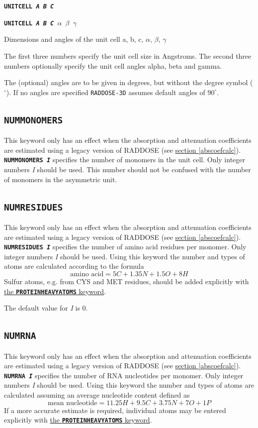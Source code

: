\documentclass[a4paper]{article}
\newcommand{\RD}{\texttt{RADDOSE-3D}\xspace}
\newcommand{\Keyword}[1]{\texttt{\textbf{#1}}\xspace}
\newcommand{\SB}{\\[0.2em]}
\newcommand{\RDLegacyKeyword}{This keyword only has an effect when the absorption and attenuation coefficients are estimated using a legacy version of RADDOSE (see \hyperref[abscoefcalc]{section \ref*{abscoefcalc}}).\SB
}
\begin{document}
\noindent \Keyword{UNITCELL \textit{A B C}}

\noindent \Keyword{UNITCELL \textit{A B C $\alpha$ $\beta$ $\gamma$}}

Dimensions and angles of the unit cell a, b, c, $\alpha$, $\beta$, $\gamma$

The first three numbers specify the unit cell size in Angstroms. The second three numbers optionally specify the unit cell angles alpha, beta and gamma.

The (optional) angles are to be given in degrees, but without the degree symbol ($^\circ$). If no angles are specified \RD assumes default angles of $90^\circ$.

\subsection{\Keyword{NUMMONOMERS}}
\label{nummonomers}
\RDLegacyKeyword

\noindent \Keyword{NUMMONOMERS \textit{I}}
specifies the number of monomers in the unit cell. Only integer numbers \textit{I} should be used. This number should not be confused with the number of monomers in the asymmetric unit.


\subsection{\Keyword{NUMRESIDUES}}
\label{numresidues}
\RDLegacyKeyword

\noindent \Keyword{NUMRESIDUES \textit{I}}
specifies the number of amino acid residues per monomer. Only integer numbers \textit{I} should be used. Using this keyword the number and types of atoms are calculated according to the formula
\[ \mbox{amino acid} = 5 C + 1.35 N + 1.5 O + 8 H \]
Sulfur atoms, e.g. from CYS and MET residues, should be added explicitly with \hyperref[proteinheavyatoms]{the \Keyword{PROTEINHEAVYATOMS} keyword}.

The default value for \textit{I} is 0.


\subsection{\Keyword{NUMRNA}}
\label{numrna}
\RDLegacyKeyword

\noindent \Keyword{NUMRNA \textit{I}}
specifies the number of RNA nucleotides per monomer. Only integer numbers \textit{I} should be used. Using this keyword the number and types of atoms are calculated assuming an average nucleotide content defined as
\[ \mbox{mean nucleotide} = 11.25H + 9.5C + 3.75N + 7O + 1P \]
If a more accurate estimate is required, individual atoms may be entered explicitly with \hyperref[proteinheavyatoms]{the \Keyword{PROTEINHEAVYATOMS} keyword}.
\end{document}
